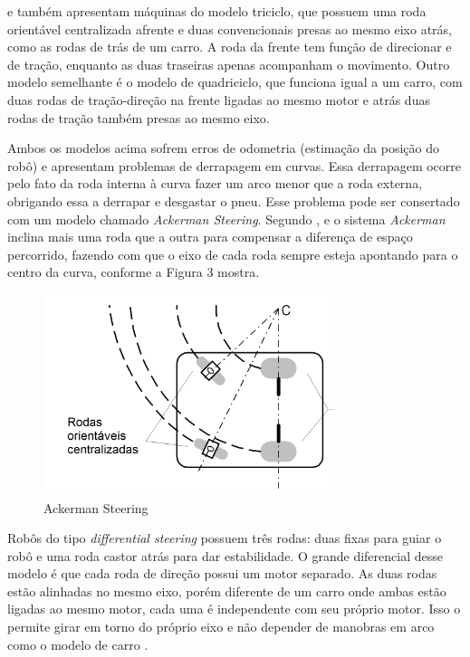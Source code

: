 \cite{Secchi2008} e \cite{Borenstein1996} também apresentam máquinas do modelo triciclo, que possuem uma roda orientável centralizada afrente e duas convencionais presas ao mesmo eixo atrás, como as rodas de trás de um carro. A roda da frente tem função de direcionar e de tração, enquanto as duas traseiras apenas acompanham o movimento. Outro modelo semelhante é o modelo de quadriciclo, que funciona igual a um carro, com duas rodas de tração-direção na frente ligadas ao mesmo motor e atrás duas rodas de tração também presas ao mesmo eixo. 

Ambos os modelos acima sofrem erros de odometria (estimação da posição do robô) e apresentam problemas de derrapagem em curvas. Essa derrapagem ocorre pelo fato da roda interna à curva fazer um arco menor que a roda externa, obrigando essa a derrapar e desgastar o pneu. Esse problema pode ser consertado com um modelo chamado \textit{Ackerman Steering}. Segundo \cite{Borenstein1996}, \cite{Secchi2008} e \cite{Bagnall2011} o sistema \textit{Ackerman} inclina mais uma roda que a outra para compensar a diferença de espaço percorrido, fazendo com que o eixo de cada roda sempre esteja apontando para o centro da curva, conforme a Figura 3 mostra.

\begin{figure}[h]
	\centering
	\label{fig03}
		\includegraphics[keepaspectratio=true,scale=1]{figuras/2ackerman.png}
	\caption{Ackerman Steering \cite{Secchi2008}}
\end{figure}

Robôs do tipo \textit{differential steering} possuem três rodas: duas fixas para guiar o robô e uma roda castor atrás para dar estabilidade. O grande diferencial desse modelo é que cada roda de direção possui um motor separado. As duas rodas estão alinhadas no mesmo eixo, porém diferente de um carro onde ambas estão ligadas ao mesmo motor, cada uma é independente com seu próprio motor. Isso o permite girar em torno do próprio eixo e não depender de manobras em arco como o modelo de carro \cite{Bagnall2011} \cite{Secchi2008} \cite{Mataric2007}.

